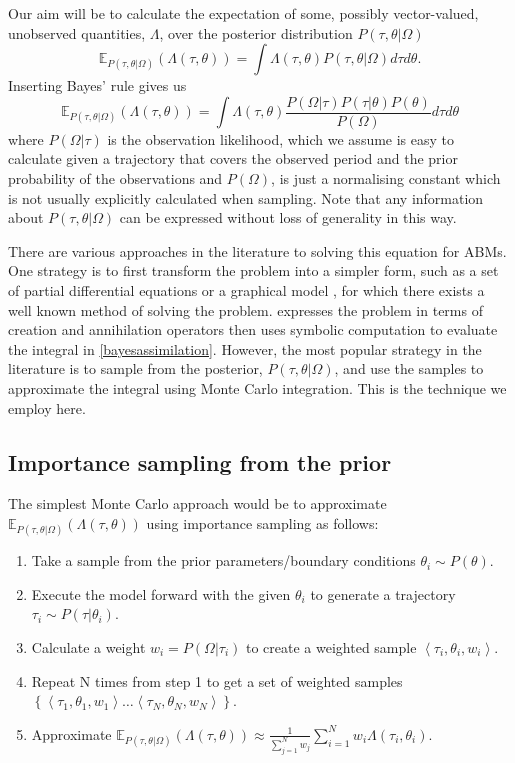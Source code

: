 \documentclass{article}
\begin{document}
Our aim will be to calculate the expectation of some, possibly vector-valued, unobserved quantities, $\Lambda$, over the posterior distribution $P(\tau,\theta | \Omega)$
\begin{equation}
\mathbb{E}_{P(\tau,\theta|\Omega)}(\Lambda(\tau,\theta)) = \int \Lambda(\tau,\theta) P(\tau,\theta|\Omega) d\tau d\theta.
\label{expectation}
\end{equation}
Inserting Bayes' rule gives us
\begin{equation}
\mathbb{E}_{P(\tau,\theta|\Omega)}(\Lambda(\tau,\theta)) = \int \Lambda(\tau,\theta) \frac{P(\Omega|\tau)P(\tau|\theta)P(\theta)}{P(\Omega)} d\tau d\theta
\label{bayesassimilation}
\end{equation}
where $P(\Omega|\tau)$ is the observation likelihood, which we assume is easy to calculate given a trajectory that covers the observed period and the prior probability of the observations and $P(\Omega)$, is just a normalising constant which is not usually explicitly calculated when sampling. Note that any information about $P(\tau,\theta | \Omega)$ can be expressed without loss of generality in this way.

There are various approaches in the literature to solving this equation for ABMs. One strategy is to first transform the problem into a simpler form, such as a set of partial differential equations \citep{lloyd_exploring_2016} or a graphical model \citep{liao2010integrated}, for which there exists a well known method of solving the problem. \citet{tang2019data} expresses the problem in terms of creation and annihilation operators then uses symbolic computation to evaluate the integral in \eqref{bayesassimilation}. However, the most popular strategy in the literature is to sample from the posterior, $P(\tau,\theta|\Omega)$, and use the samples to approximate the integral using Monte Carlo integration. This is the technique we employ here.

\subsection{Importance sampling from the prior}
The simplest Monte Carlo approach would be to approximate $\mathbb{E}_{P(\tau,\theta|\Omega)}(\Lambda(\tau,\theta))$ using importance sampling as follows:
\begin{enumerate}
\item Take a sample from the prior parameters/boundary conditions $\theta_i \sim P(\theta)$.
\item Execute the model forward with the given $\theta_i$ to generate a trajectory $\tau_{i} \sim P(\tau|\theta_i)$.
\item Calculate a weight $w_i = P(\Omega|\tau_i)$ to create a weighted sample $\left<\tau_{i},\theta_i, w_i\right>$.
\item Repeat  N times from step 1 to get a set of weighted samples $\left\{\left<\tau_1,\theta_1,w_1\right> \dots \left<\tau_N,\theta_N,w_N\right> \right\}$.
\item Approximate $\mathbb{E}_{P(\tau,\theta|\Omega)}(\Lambda(\tau,\theta)) \approx \frac{1}{\sum_{j=1}^Nw_j}\sum_{i=1}^N w_i\Lambda(\tau_i,\theta_i)$.
\end{enumerate}
\end{document}

